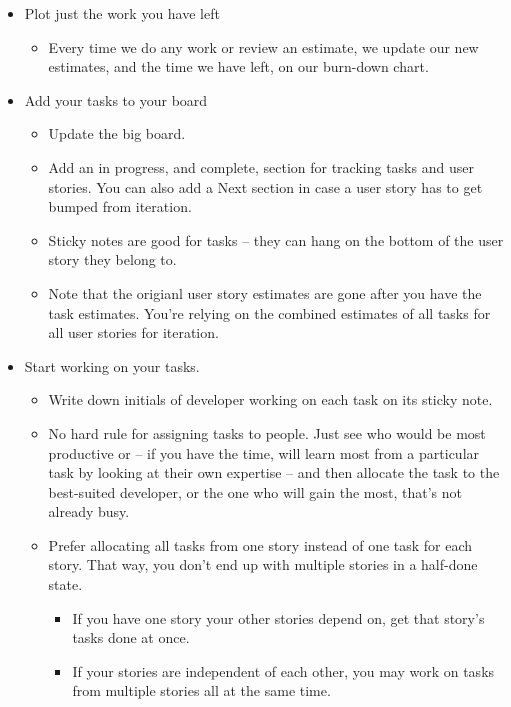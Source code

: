 \documentclass[letterpaper]{article}
\begin{document}
\begin{itemize}
    \item Plot just the work you have left 
    \begin{itemize}
        \item Every time we do any work or review an estimate, we update our new estimates, and the time we have left, on our burn-down chart.
    \end{itemize}

    \item Add your tasks to your board 
    \begin{itemize}
        \item Update the big board. 
        \item Add an in progress, and complete, section for tracking tasks and user stories. You can also add a Next section in case a user story has to get bumped from iteration. 
        \item Sticky notes are good for tasks -- they can hang on the bottom of the user story they belong to. 
        \item Note that the origianl user story estimates are gone after you have the task estimates. You're relying on the combined estimates of all tasks for all user stories for iteration. 
    \end{itemize}

    \item Start working on your tasks. 
    \begin{itemize}
        \item Write down initials of developer working on each task on its sticky note. 
        \item No hard rule for assigning tasks to people. Just see who would be most productive or -- if you have the time, will learn most from a particular task by looking at their own expertise -- and then allocate the task to the best-suited developer, or the one who will gain the most, that's not already busy. 
        \item Prefer allocating all tasks from one story instead of one task for each story. That way, you don't end up with multiple stories in a half-done state. 
        \begin{itemize}
            \item If you have one story your other stories depend on, get that story's tasks done at once. 
            \item If your stories are independent of each other, you may work on tasks from multiple stories all at the same time. 
        \end{itemize}
    \end{itemize}


\end{itemize}
\end{document}
